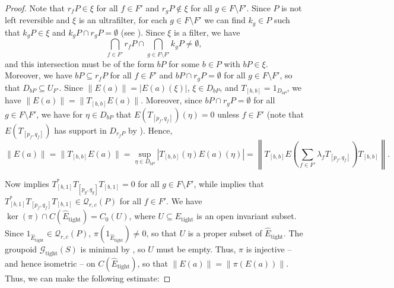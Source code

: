 \documentclass[12pt]{amsart}
\theoremstyle{definition}
\theoremstyle{remark}
\numberwithin{equation}{section}
\newcommand{\Q}{\mathcal{Q}}
\newcommand{\Et}{\widehat E_{\text{tight}}}
\newcommand{\gt}{\mathcal{G}_{\text{tight}}}
\begin{document}
\begin{proof}
Note that $r_fP\in \xi$ for all $f\in F'$ and $r_gP\not\in\xi$ for all $g\in F\setminus F'$. Since $P$ is not left reversible and $\xi$ is an ultrafilter, for each $g\in F\setminus F'$ we can find $k_g\in P$ such that $k_gP\in\xi$ and $k_gP\cap r_gP = \emptyset$ (see \cite[Lemma~12.3]{Ex08}). Since $\xi$ is a filter, we have 
	\[
 \bigcap_{f\in F'}r_fP\cap \bigcap_{g\in F\setminus F'}k_gP\neq \emptyset,
 \]
and this intersection must be of the form $bP$ for some $b\in P$ with $bP\in\xi$. Moreover, we have $bP\subseteq r_fP$ for all $f\in F'$ and $bP\cap r_gP = \emptyset$ for all $g\in F\setminus F'$, so that $D_{bP}\subseteq U_{F'}$. Since $\|E(a)\|=|E(a)(\xi)|$, $\xi\in D_{bP}$, and $T_{[b,b]}=1_{D_{bP}}$, we have $\|E(a)\| =\|T_{[b,b]}E(a)\|$. Moreover, since $bP\cap r_gP=\emptyset$ for all $g\in F\setminus F'$, we have for $\eta\in D_{bP}$ that $E(T_{[p_f,q_f]})(\eta)=0$ unless $f\in F'$ (note that $E(T_{[p_f,q_f]})$ has support in $D_{r_fP}$ by \cite[Proposition~3.14]{EP}). Hence,
	\begin{equation}
     \label{eqn:norm}
	\|E(a)\| =\|T_{[b,b]}E(a)\|=\sup_{\eta\in D_{bP}}|T_{[b,b]}(\eta)E(a)(\eta)|=\left\|T_{[b,b]}E\left(\sum_{f\in F'}\lambda_fT_{[p_f,q_f]}\right)T_{[b,b]}\right\|. 
	 \end{equation} 
	
Now \cite[Lemma~4.2]{St22} implies $T_{[b,1]}^*T_{[p_g,q_g]}T_{[b,1]} = 0$ for all $g\in F\setminus F'$, while \cite[Lemma~4.3]{St22} implies that $T_{[b,1]}^*T_{[p_f,q_f]}T_{[b,1]} \in \Q_{r,c}(P)$ for all $f\in F'$. 
We have $\ker(\pi)\cap C(\Et)=C_0(U)$, where $U\subseteq \Et$ is an open invariant subset. Since $1_{\Et}\in\Q_{r,c}(P)$, $\pi(1_{\Et})\neq 0$, so that $U$ is a proper subset of $\Et$. The groupoid $\gt(S)$ is minimal by \cite[Lemma~4.2]{StLCM}, so $U$ must be empty. Thus, $\pi$ is injective -- and hence isometric -- on $C(\Et)$, so that $\|E(a)\| = \|\pi(E(a))\|$.  
Thus, we can make the following estimate:
		

\end{proof}
\end{document}
